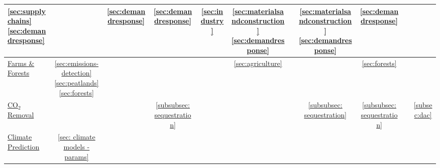 \begin{table*}[t]
\begin{tabular}{l|cccccccccc}
         \specialcell{\ref{sec:supplychains}\\\ref{sec:demandresponse}} %
         & %
         & \ref{sec:demandresponse} %
         & \ref{sec:demandresponse} %
         &
        \ref{sec:industry} %
         &
         \specialcell{\ref{sec:materialsandconstruction}\\\ref{sec:demandresponse}} %
         & %
         &
         \specialcell{\ref{sec:materialsandconstruction}\\\ref{sec:demandresponse}} %
         & \ref{sec:demandresponse} %
         & %
    \\ \hline
         \hyperref[sec:afolu]{\small{Farms \& Forests}}
         &
         \specialcell{\ref{sec:emissions-detection}\\\ref{sec:peatlands}\\\ref{sec:forests}} %
         & %
         & %
         & %
         & \ref{sec:agriculture} %
         & %
         & %
         & \ref{sec:forests} %
         & %
         & %
    \\ \hline
         \hyperref[sec:ccs]{\small{CO$_2$ Removal}}
         & %
         & %
         & \ref{subsubsec: sequestration} %
         & %
         & %
         & %
         & \ref{subsubsec: sequestration} %
         & \ref{subsubsec: sequestration} %
         & %
         & \ref{subsec:dac} %
    \\ \hline
         \hyperref[sec: climate prediction]{\small{Climate Prediction}}
         & \ref{sec: climate models - params} %

\end{tabular}
\end{table*}
